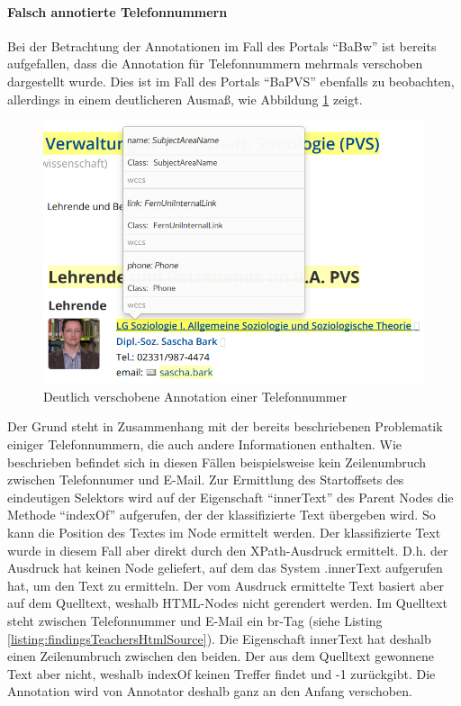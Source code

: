     \paragraph{Falsch annotierte Telefonnummern}
    Bei der Betrachtung der Annotationen im Fall des Portals "`BaBw"'
    ist bereits aufgefallen, dass die Annotation für Telefonnummern
    mehrmals verschoben dargestellt wurde.
    Dies ist im Fall des Portals "`BaPVS"' ebenfalls zu beobachten,
    allerdings in einem deutlicheren Ausmaß,
    wie Abbildung \ref{image:findingTeachersBaPVSWrongPhone} zeigt.

    \begin{figure}[htb]
        \centering
        \includegraphics[scale=\screenshotScaleFactor]{../resources/findings/case-study-1/bapvs/annotations/triple-annotation.png}
        \caption{Deutlich verschobene Annotation einer Telefonnummer}
        \label{image:findingTeachersBaPVSWrongPhone}
    \end{figure}

    Der Grund steht in Zusammenhang mit der bereits beschriebenen Problematik
    einiger Telefonnummern, die auch andere Informationen enthalten.
    Wie beschrieben befindet sich in diesen Fällen beispielsweise kein
    Zeilenumbruch zwischen Telefonnumer und E-Mail.
    Zur Ermittlung des Startoffsets des eindeutigen Selektors
    wird auf der Eigenschaft "`innerText"' des Parent Nodes
    die Methode "`indexOf"' aufgerufen, der der klassifizierte Text
    übergeben wird. So kann die Position des Textes im Node ermittelt werden.
    Der klassifizierte Text wurde in diesem Fall aber direkt durch den
    XPath-Ausdruck ermittelt.
    D.h. der Ausdruck hat keinen Node geliefert, auf dem das System .innerText
    aufgerufen hat, um den Text zu ermitteln.
    Der vom Ausdruck ermittelte Text basiert aber auf dem Quelltext,
    weshalb HTML-Nodes nicht gerendert werden.
    Im Quelltext steht zwischen Telefonnummer und E-Mail ein br-Tag
    (siehe Listing \ref{listing:findingsTeachersHtmlSource}).
    Die Eigenschaft innerText hat deshalb einen Zeilenumbruch zwischen den beiden.
    Der aus dem Quelltext gewonnene Text aber nicht,
    weshalb indexOf keinen Treffer findet und -1 zurückgibt.
    Die Annotation wird von Annotator deshalb ganz an den Anfang verschoben.